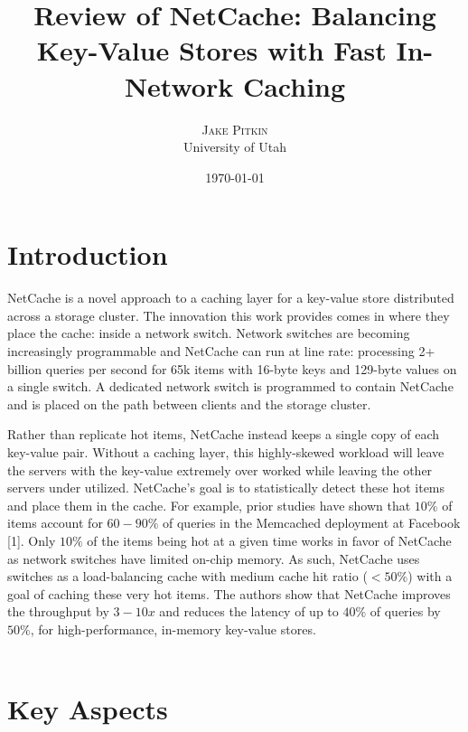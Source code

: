 \documentclass[11pt,twoside,twocolumn]{article}
\title{Review of NetCache: Balancing Key-Value Stores with Fast In-Network Caching} %
\author{%
\textsc{Jake Pitkin} \\ %
\normalsize University of Utah \\ %
}
\date{\today} %
\begin{document}
\maketitle


\section*{Introduction} NetCache is a novel approach to a caching layer for a key-value store distributed across a storage cluster. The innovation this work provides comes in where they place the cache: inside a network switch. Network switches are becoming increasingly programmable and NetCache can run at line rate: processing 2+ billion queries per second for 65k items with 16-byte keys and 129-byte values on a single switch. A dedicated network switch is programmed to contain NetCache and is placed on the path between clients and the storage cluster.

Rather than replicate hot items, NetCache instead keeps a single copy of each key-value pair. Without a caching layer, this highly-skewed workload will leave the servers with the key-value extremely over worked while leaving the other servers under utilized. NetCache's goal is to statistically detect these hot items and place them in the cache. For example, prior studies have shown that $10\%$ of items account for $60-90\%$ of queries in the Memcached deployment at Facebook [1]. Only $10\%$ of the items being hot at a given time works in favor of NetCache as network switches have limited on-chip memory. As such, NetCache uses switches as a load-balancing cache with medium cache hit ratio ($<50\%$) with a goal of caching these very hot items. The authors show that NetCache improves the throughput by $3-10x$ and reduces the latency of up to $40\%$ of queries by $50\%$, for high-performance, in-memory key-value stores. \\ \\


\section*{Key Aspects}
\end{document}

